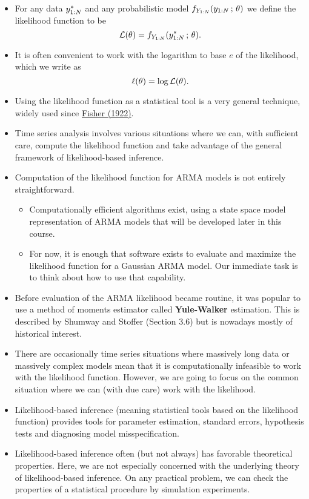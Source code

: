 \documentclass[]{article}
\begin{document}
\begin{itemize}
\item
  For any data \(y_{1:N}^*\) and any probabilistic model
  \(f_{Y_{1:N}}(y_{1:N}\, ; \,\theta)\) we define the likelihood
  function to be
  \[ \mathcal{L}(\theta) = f_{Y_{1:N}}(y_{1:N}^*\, ; \,\theta).\]
\item
  It is often convenient to work with the logarithm to base \(e\) of the
  likelihood, which we write as \[\ell(\theta) = \log \mathcal{L}(\theta).\]
\item
  Using the likelihood function as a statistical tool is a very general
  technique, widely used since
  \href{https://en.wikipedia.org/wiki/Likelihood_function}{Fisher
  (1922)}.
\item
  Time series analysis involves various situations where we can, with
  sufficient care, compute the likelihood function and take advantage of
  the general framework of likelihood-based inference.
\item
  Computation of the likelihood function for ARMA models is not entirely
  straightforward.

  \begin{itemize}
  \item
    Computationally efficient algorithms exist, using a state space
    model representation of ARMA models that will be developed later in
    this course.
  \item
    For now, it is enough that software exists to evaluate and maximize
    the likelihood function for a Gaussian ARMA model. Our immediate
    task is to think about how to use that capability.
  \end{itemize}
\item
  Before evaluation of the ARMA likelihood became routine, it was
  popular to use a method of moments estimator called
  \textbf{Yule-Walker} estimation. This is described by Shumway and
  Stoffer (Section 3.6) but is nowadays mostly of historical interest.
\item
  There are occasionally time series situations where massively long
  data or massively complex models mean that it is computationally
  infeasible to work with the likelihood function. However, we are going
  to focus on the common situation where we can (with due care) work
  with the likelihood.
\item
  Likelihood-based inference (meaning statistical tools based on the
  likelihood function) provides tools for parameter estimation, standard
  errors, hypothesis tests and diagnosing model misspecification.
\item
  Likelihood-based inference often (but not always) has favorable
  theoretical properties. Here, we are not especially concerned with the
  underlying theory of likelihood-based inference. On any practical
  problem, we can check the properties of a statistical procedure by
  simulation experiments.
\end{itemize}
\end{document}
